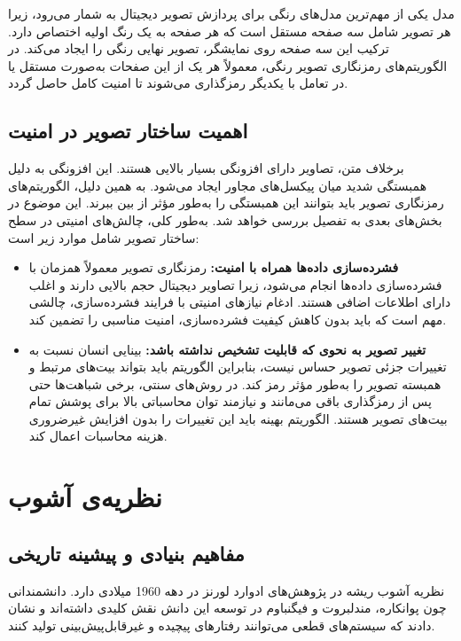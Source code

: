 مدل  یکی از مهم‌ترین مدل‌های رنگی برای پردازش تصویر دیجیتال به شمار می‌رود، زیرا هر تصویر شامل سه صفحه مستقل است که هر صفحه به یک رنگ اولیه اختصاص دارد. ترکیب این سه صفحه روی نمایشگر، تصویر نهایی رنگی را ایجاد می‌کند. در الگوریتم‌های رمزنگاری تصویر رنگی، معمولاً هر یک از این صفحات به‌صورت مستقل یا در تعامل با یکدیگر رمزگذاری می‌شوند تا امنیت کامل حاصل گردد.

\subsection{اهمیت ساختار تصویر در امنیت}
برخلاف متن، تصاویر دارای افزونگی بسیار بالایی هستند. این افزونگی به دلیل همبستگی شدید میان پیکسل‌های مجاور ایجاد می‌شود. به همین دلیل، الگوریتم‌های رمزنگاری تصویر باید بتوانند این همبستگی را به‌طور مؤثر از بین ببرند. این موضوع در بخش‌های بعدی به تفصیل بررسی خواهد شد. به‌طور کلی، چالش‌های امنیتی در سطح ساختار تصویر شامل موارد زیر است:

\begin{itemize}
    \item \textbf{فشرده‌سازی داده‌ها همراه با امنیت:} رمزنگاری تصویر معمولاً همزمان با فشرده‌سازی داده‌ها انجام می‌شود، زیرا تصاویر دیجیتال حجم بالایی دارند و اغلب دارای اطلاعات اضافی هستند. ادغام نیازهای امنیتی با فرایند فشرده‌سازی، چالشی مهم است که باید بدون کاهش کیفیت فشرده‌سازی، امنیت مناسبی را تضمین کند.
    \item \textbf{تغییر تصویر به نحوی که قابلیت تشخیص نداشته باشد:} بینایی انسان نسبت به تغییرات جزئی تصویر حساس نیست، بنابراین الگوریتم باید بتواند بیت‌های مرتبط و همبسته تصویر را به‌طور مؤثر رمز کند. در روش‌های سنتی، برخی شباهت‌ها حتی پس از رمزگذاری باقی می‌مانند و نیازمند توان محاسباتی بالا برای پوشش تمام بیت‌های تصویر هستند. الگوریتم بهینه باید این تغییرات را بدون افزایش غیرضروری هزینه محاسبات اعمال کند.
\end{itemize}

\section{نظریه‌ی آشوب}
\subsection{مفاهیم بنیادی و پیشینه تاریخی}
نظریه آشوب ریشه در پژوهش‌های ادوارد لورنز در دهه 1960 میلادی دارد. دانشمندانی چون پوانکاره، مندلبروت و فیگنباوم در توسعه این دانش نقش کلیدی داشته‌اند و نشان دادند که سیستم‌های قطعی می‌توانند رفتارهای پیچیده و غیرقابل‌پیش‌بینی تولید کنند.

